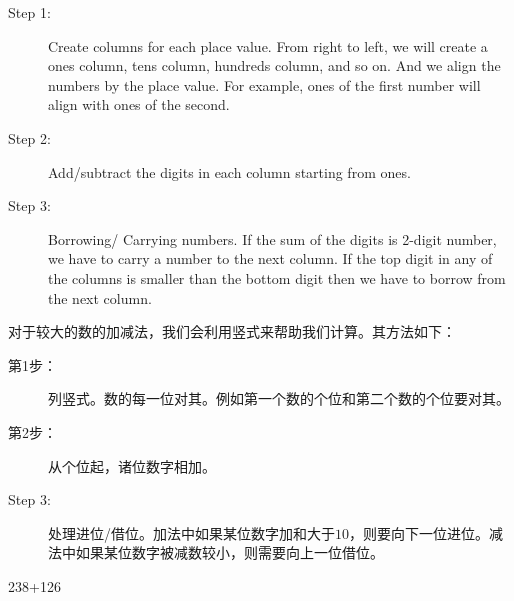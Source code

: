 \begin{paracol}{2}
\begin{description}
\item [Step 1: ] Create columns for each place value. From right to left, we will create a ones column,  tens column, hundreds column, and so on. And we align the numbers by the place value. For example, ones of the first number will align with ones of the second. 
\item [Step 2: ]  Add/subtract the digits in each column starting from ones. 
\item [Step 3: ] Borrowing/ Carrying numbers. If the sum of the digits is 2-digit number, we have to carry a number to the next column. If the top digit in any of the columns is smaller than the bottom digit then we have to borrow from the next column.
\end{description}
\switchcolumn[1]
对于较大的数的加减法，我们会利用竖式来帮助我们计算。其方法如下：
\begin{description}
\item [第1步： ] 列竖式。数的每一位对其。例如第一个数的个位和第二个数的个位要对其。
\item [第2步：] 从个位起，诸位数字相加。
\item [Step 3: ] 处理进位/借位。加法中如果某位数字加和大于$10$，则要向下一位进位。减法中如果某位数字被减数较小，则需要向上一位借位。
\end{description}
\end{paracol}
\begin{example}
238+126
\end{example}
